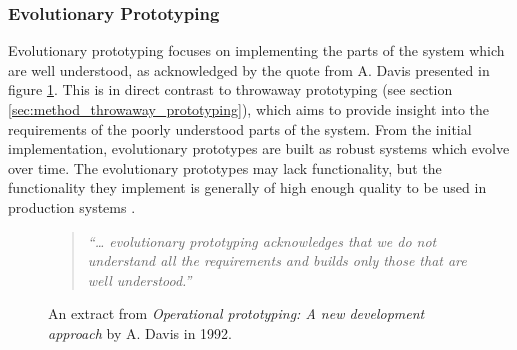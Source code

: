 
\subsubsection{Evolutionary Prototyping}
\label{sec:method_evolutionary_prototyping}

Evolutionary prototyping focuses on implementing the parts of the system which are well understood, as acknowledged by the quote from A. Davis presented in figure \ref{fig:evolutionary_prototyping}. This is in direct contrast to throwaway prototyping (see section \ref{sec:method_throwaway_prototyping}), which aims to provide insight into the requirements of the poorly understood parts of the system. From the initial implementation, evolutionary prototypes are built as robust systems which evolve over time. The evolutionary prototypes may lack functionality, but the functionality they implement is generally of high enough quality to be used in production systems \cite{operational_prototyping}.

\begin{figure}[htbp]
	\begin{quote}
		\textit{``… evolutionary prototyping acknowledges that we do not understand all the requirements and builds only those that are well understood.''} \cite{operational_prototyping}
	\end{quote}
	\caption{An extract from \textit{Operational prototyping: A new development approach} by A. Davis in 1992.}
	\label{fig:evolutionary_prototyping}
\end{figure}
